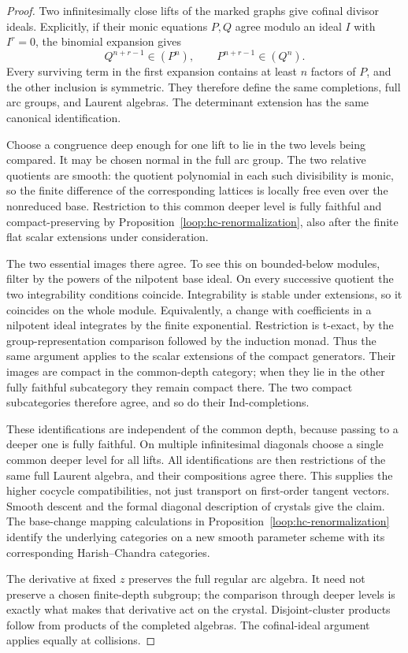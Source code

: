 \documentclass[11pt]{article}
\numberwithin{equation}{section}
\theoremstyle{definition}
\theoremstyle{remark}
\begin{document}
\begin{proof}
Two infinitesimally close lifts of the marked graphs give cofinal
divisor ideals.  Explicitly, if their monic equations $P,Q$ agree
modulo an ideal $I$ with $I^r=0$, the binomial expansion gives
\[
               Q^{n+r-1}\in(P^n),\qquad
               P^{n+r-1}\in(Q^n).
\]
Every surviving term in the first expansion contains at least $n$
factors of $P$, and the other inclusion is symmetric.  They therefore
define the same completions,
full arc groups, and Laurent algebras.  The determinant extension
has the same canonical identification.

Choose a congruence deep enough for one lift to lie in the two
levels being compared.  It may be chosen normal in the full arc
group.  The two relative quotients are smooth: the quotient polynomial
in each such divisibility is monic, so the finite difference of the
corresponding lattices is locally free even over the nonreduced base.
Restriction to this common deeper level is fully faithful and
compact-preserving by Proposition~\ref{loop:hc-renormalization}, also
after the finite flat scalar extensions under consideration.

The two essential images there agree.  To see this on bounded-below
modules, filter by the powers of the nilpotent base ideal.  On every
successive quotient the two integrability conditions coincide.
Integrability is stable under extensions, so it coincides on the
whole module.  Equivalently, a change with coefficients in a
nilpotent ideal integrates by the finite exponential.  Restriction
is t-exact, by the group-representation comparison followed by the
induction monad.  Thus the same argument applies to the scalar
extensions of the compact generators.  Their images are compact in
the common-depth category; when they lie in the other fully faithful
subcategory they remain compact there.  The two compact subcategories
therefore agree, and so do their Ind-completions.

These identifications are independent of the common depth, because
passing to a deeper one is fully faithful.  On multiple
infinitesimal diagonals choose a single common deeper level for
all lifts.  All identifications are then restrictions of the same
full Laurent algebra, and their compositions agree there.  This
supplies the higher cocycle compatibilities, not just transport on
first-order tangent vectors.  Smooth descent and the formal
diagonal description of crystals give the claim.  The base-change
mapping calculations in Proposition~\ref{loop:hc-renormalization}
identify the underlying categories on a new smooth parameter
scheme with its corresponding Harish--Chandra categories.

The derivative at fixed $z$ preserves the full regular arc
algebra.  It need not preserve a chosen finite-depth subgroup;
the comparison through deeper levels is exactly what makes that
derivative act on the crystal.  Disjoint-cluster products follow
from products of the completed algebras.  The cofinal-ideal
argument applies equally at collisions.
\end{proof}
\end{document}
